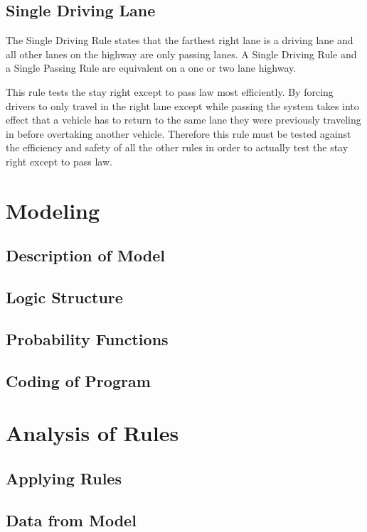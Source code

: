 \documentclass{amsart}
\begin{document}
	\subsection{Single Driving Lane}
	The Single Driving Rule states that the farthest right lane is a driving lane and all other lanes on the highway are only passing lanes.  A Single Driving Rule and a Single Passing Rule are equivalent on a one or two lane highway.  

	This rule tests the stay right except to pass law most efficiently.  By forcing drivers to only travel in the right lane except while passing the system takes into effect that a vehicle has to return to the same lane they were previously traveling in before overtaking another vehicle. Therefore this rule must be tested against the efficiency and safety of all the other rules in order to actually test the stay right except to pass law.    

\section{\bfseries{Modeling}}
	\subsection{Description of Model}
	\subsection{Logic Structure}
	\subsection{Probability Functions}
	
	\subsection{Coding of Program}

\section{\bfseries{Analysis of Rules}}
	\subsection{Applying Rules}
	\subsection{Data from Model}
\end{document}

